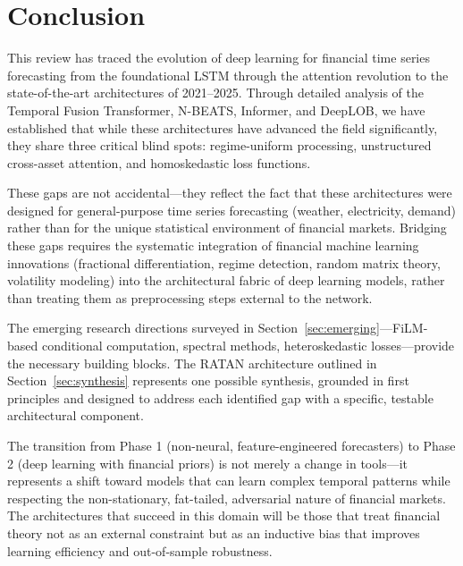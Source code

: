 \documentclass[conference]{IEEEtran}
\begin{document}
\section{Conclusion}
\label{sec:conclusion}

This review has traced the evolution of deep learning for financial time series forecasting from the foundational LSTM through the attention revolution to the state-of-the-art architectures of 2021--2025. Through detailed analysis of the Temporal Fusion Transformer, N-BEATS, Informer, and DeepLOB, we have established that while these architectures have advanced the field significantly, they share three critical blind spots: regime-uniform processing, unstructured cross-asset attention, and homoskedastic loss functions.

These gaps are not accidental---they reflect the fact that these architectures were designed for general-purpose time series forecasting (weather, electricity, demand) rather than for the unique statistical environment of financial markets. Bridging these gaps requires the systematic integration of financial machine learning innovations (fractional differentiation, regime detection, random matrix theory, volatility modeling) into the architectural fabric of deep learning models, rather than treating them as preprocessing steps external to the network.

The emerging research directions surveyed in Section~\ref{sec:emerging}---FiLM-based conditional computation, spectral methods, heteroskedastic losses---provide the necessary building blocks. The RATAN architecture outlined in Section~\ref{sec:synthesis} represents one possible synthesis, grounded in first principles and designed to address each identified gap with a specific, testable architectural component.

The transition from Phase 1 (non-neural, feature-engineered forecasters) to Phase 2 (deep learning with financial priors) is not merely a change in tools---it represents a shift toward models that can learn complex temporal patterns while respecting the non-stationary, fat-tailed, adversarial nature of financial markets. The architectures that succeed in this domain will be those that treat financial theory not as an external constraint but as an inductive bias that improves learning efficiency and out-of-sample robustness.
\end{document}
